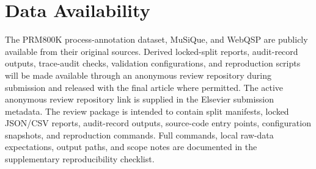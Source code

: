 \section*{Data Availability}
The PRM800K process-annotation dataset, MuSiQue, and WebQSP are publicly available from their original sources. Derived locked-split reports, audit-record outputs, trace-audit checks, validation configurations, and reproduction scripts will be made available through an anonymous review repository during submission and released with the final article where permitted. The active anonymous review repository link is supplied in the Elsevier submission metadata. The review package is intended to contain split manifests, locked JSON/CSV reports, audit-record outputs, source-code entry points, configuration snapshots, and reproduction commands. Full commands, local raw-data expectations, output paths, and scope notes are documented in the supplementary reproducibility checklist.

